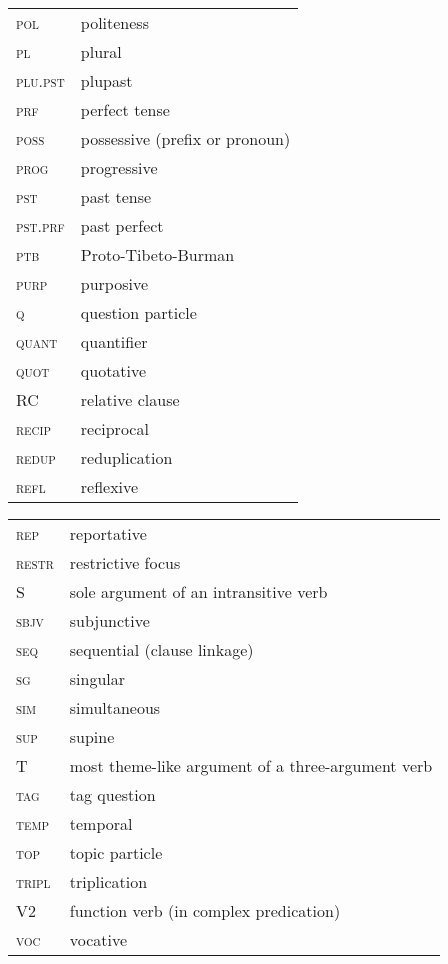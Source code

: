 \begin{multicols}{2}
\begin{tabular}{lp{4.5cm}} 
\textsc{pol} &  politeness\\
\textsc{pl} &  		 plural\\
\textsc{plu.pst} &  plupast\\
\textsc{prf} &  perfect tense\\
\textsc{poss} &   possessive (prefix or pronoun)\\
\textsc{prog} &   progressive\\
\textsc{pst} &   past tense\\
\textsc{pst.prf} &   past perfect\\
\textsc{ptb} &   Proto-Tibeto-Burman\\
\textsc{purp} &  purposive\\
\textsc{q} &   question particle\\
\textsc{quant} &   quantifier\\
\textsc{quot} &   quotative\\
\textsc{RC} &   relative clause\\
\textsc{recip} &   reciprocal\\
\textsc{redup} &  reduplication\\
\textsc{refl} &  reflexive\\
\end{tabular}

\begin{tabular}{lp{4.5cm}} 
\textsc{rep} &   reportative\\
\textsc{restr} &  restrictive focus\\
S 	& sole argument of an intransitive verb\\
\textsc{sbjv} &   subjunctive\\
\textsc{seq} &  sequential (clause linkage)\\
\textsc{sg} &  		 singular\\
\textsc{sim} &   simultaneous\\
\textsc{sup} &   supine\\
T  & most theme-like argument of a three-argument verb\\
\textsc{tag} &   tag question\\
\textsc{temp} &  temporal\\
\textsc{top} &   topic particle\\
\textsc{tripl} &  triplication\\
\textsc{V2} &  function verb (in complex predication)\\
\textsc{voc} &  vocative\\
\end{tabular}
\end{multicols}


